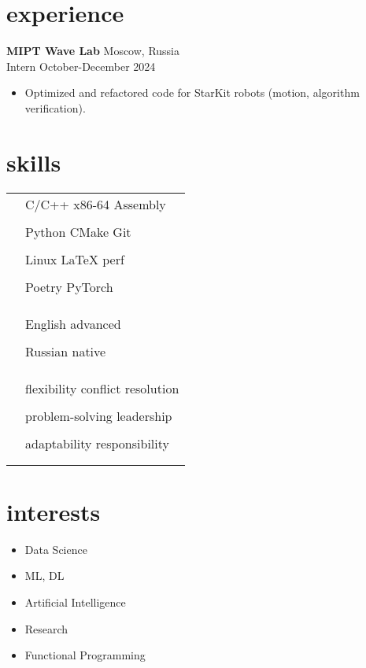 \documentclass[12pt]{article}
\newcommand{\entry}[4]{{{\textbf{#1}}} \hfill #3 \\ #2 \hfill #4}
\newcommand{\tableentry}[3]{\textsc{#1} & #2\expandafter\ifstrequal\expandafter{#3}{}{\\}{\\[6pt]}}
\begin{document}
\begin{paracol}{2}
		
		\section{experience}
		
		\entry{MIPT Wave Lab}{Intern}{Moscow, Russia}{October-December 2024}
		\begin{itemize}[noitemsep,leftmargin=3.5mm,rightmargin=0mm,topsep=6pt]
			\item Optimized and refactored code for StarKit robots (motion, algorithm verification).
		\end{itemize}
		
		\switchcolumn
		
		\section{skills}
		\begin{supertabular}{rl}
			\tableentry{\footnotesize\faCode}{C/C++ \textperiodcentered{} x86-64 Assembly}{}
			\tableentry{}{Python \textperiodcentered{} CMake \textperiodcentered{} Git}{}
			\tableentry{}{Linux
				\textperiodcentered{} LaTeX \textperiodcentered{} perf}{}
			\tableentry{}{Poetry \textperiodcentered{} PyTorch}{}
			
			
			\tableentry{}{}{}
			
			\tableentry{\footnotesize\faLanguage}{English \textperiodcentered{} advanced}{}
			\tableentry{}{Russian \textperiodcentered{} native}{}
			\tableentry{}{}{}
			
			\tableentry{\footnotesize\faComments}{flexibility \textperiodcentered{} conflict resolution}{}
			\tableentry{}{problem-solving \textperiodcentered{} leadership}{}
			\tableentry{}{adaptability \textperiodcentered{} responsibility}{}
		\end{supertabular}
		
		\section{interests}
		\begin{itemize}[noitemsep,leftmargin=3.5mm,rightmargin=0mm,topsep=6pt]
			\item Data Science
			\item ML, DL
			\item Artificial Intelligence
			\item Research
			\item Functional Programming
		\end{itemize}
		

\end{paracol}
\end{document}

